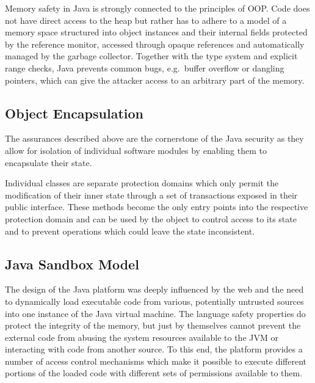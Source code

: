\documentclass[a4paper,12pt,twoside,openright]{report}
\begin{document}
Memory safety in Java is strongly connected to the principles of OOP. Code does not have direct access to the heap but rather has to adhere to a model of a memory space structured into object instances and their internal fields protected by the reference monitor, accessed through opaque references and automatically managed by the garbage collector. Together with the type system and explicit range checks, Java prevents common bugs, e.g.\ buffer overflow or dangling pointers, which can give the attacker access to an arbitrary part of the memory.

\subsection{Object Encapsulation}

The assurances described above are the cornerstone of the Java security as they allow for isolation of individual software modules by enabling them to encapsulate their state. 

Individual classes are separate protection domains which only permit the modification of their inner state through a set of transactions exposed in their public interface. These methods become the only entry points into the respective protection domain and can be used by the object to control access to its state and to prevent operations which could leave the state inconsistent.


\subsection{Java Sandbox Model}

The design of the Java platform was deeply influenced by the web and the need to dynamically load executable code from various, potentially untrusted sources into one instance of the Java virtual machine. The language safety properties do protect the integrity of the memory, but just by themselves cannot prevent the external code from abusing the system resources available to the JVM or interacting with code from another source. To this end, the platform provides a number of access control mechanisms which make it possible to execute different portions of the loaded code with different sets of permissions available to them. 
\end{document}
